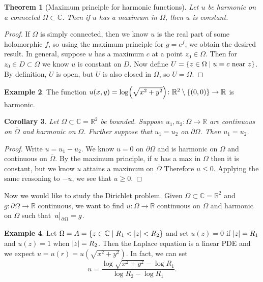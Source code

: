 \documentclass[leqno, openany]{memoir}
\newtheorem{thm}{Theorem}[section]
\newtheorem{cor}[thm]{Corollary}
\theoremstyle{definition}
\newtheorem{exm}[thm]{Example}
\theoremstyle{remark}
\theoremstyle{plain}
\theoremstyle{definition}
\theoremstyle{remark}
\newcommand{\R}{\mathbb{R}}
\newcommand{\C}{\mathbb{C}}
\newcommand{\ol}[1]{\overline{#1}}
\begin{document}
\begin{thm}[Maximum principle for harmonic functions]
    Let $u$ be harmonic on a connected $\Omega \subset \C$. Then if $u$ has a maximum in $\Omega$, then $u$ is constant.
\end{thm}

\begin{proof}
    If $\Omega$ is simply connected, then we know $u$ is the real part of some holomorphic $f$, so using the maximum principle for $g = e^f$, we obtain the desired result. In general, suppose $u$ has a maximum $c$ at a point $z_0 \in \Omega$. Then for $z_0 \in D \subset \Omega$ we know $u$ is constant on $D$. Now define $U = \qty{z \in \Omega \mid u \equiv c \text{ near }z}$. By definition, $U$ is open, but $U$ is also closed in $\Omega$, so $U = \Omega$.
\end{proof}

\begin{exm}
    The function $u(x,y) = \log(\sqrt{x^2 + y^2}) \colon \R^2 \setminus \qty{(0,0)} \to \R$ is harmonic.
\end{exm}

\begin{cor}
    Let $\Omega \subset \C = \R^2$ be bounded. Suppose $u_1, u_2 \colon \ol{\Omega} \to \R$ are continuous on $\ol{\Omega}$ and harmonic on $\Omega$. Further suppose that $u_1 = u_2$ on $\partial \Omega$. Then $u_1 = u_2$.
\end{cor}

\begin{proof}
    Write $u = u_1 - u_2$. We know $u = 0$ on $\partial \Omega$ and is harmonic on $\Omega$ and continuous on $\ol{\Omega}$. By the maximum principle, if $u$ has a max in $\Omega$ then it is constant, but we know $u$ attains a maximum on $\ol{\Omega}$ Therefore $u \leq 0$. Applying the same reasoning to $-u$, we see that $u \geq 0$.
\end{proof}

Now we would like to study the Dirichlet problem. Given $\Omega \subset \C = \R^2$ and $g \colon \partial \Omega \to \R$ continuous, we want to find $u \colon \ol{\Omega} \to \R$ continuous on $\ol{\Omega}$ and harmonic on $\Omega$ such that $\eval{u}_{\partial \Omega} = g$.

\begin{exm}
    Let $\Omega = A = \qty{z \in \C \mid R_1 < \abs{z} < R_2}$ and set $u(z) = 0$ if $\abs{z} = R_1$ and $u(z) = 1$ when $\abs{z} = R_2$. Then the Laplace equation is a linear PDE and we expect $u = u(r) = u(\sqrt{x^2+y^2})$. In fact, we can set
    \[ u = \frac{\log \sqrt{x^2 + y^2} - \log R_1}{\log R_2 - \log R_1}. \]
\end{exm}
\end{document}
